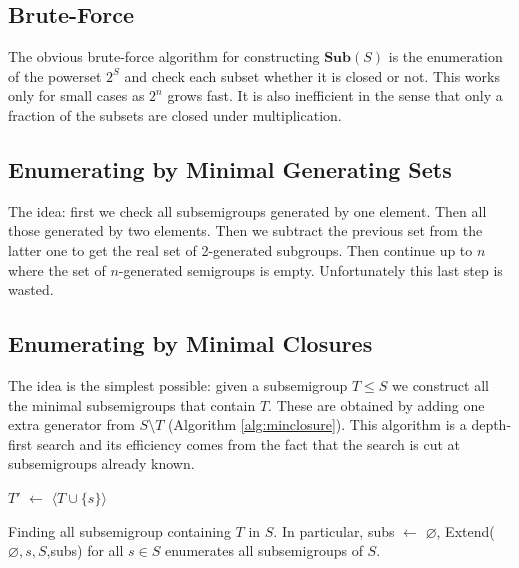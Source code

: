 \documentclass{amsart}
\newcommand{\Sub}{\mathbf{Sub}}
\theoremstyle{plain}
\theoremstyle{definition}
\begin{document}
\subsection{Brute-Force}
The obvious brute-force algorithm for constructing $\Sub(S)$ is the enumeration of the powerset $2^S$ and check each subset whether it is closed or not.
This works only for small cases as $2^n$ grows fast.
It is also inefficient in the sense that only a fraction of the subsets are closed under multiplication.
 
\subsection{Enumerating by Minimal Generating Sets}
The idea: first we check all subsemigroups generated by one element. Then all those generated by two elements. Then we subtract the previous set from the latter one to get the real set of 2-generated subgroups. Then continue up to $n$ where the set of $n$-generated semigroups is empty. Unfortunately this last step is wasted.
\subsection{Enumerating by Minimal Closures}

The idea is the simplest possible: given a subsemigroup $T\leq S$ we construct all the minimal subsemigroups that contain $T$.
These are obtained by adding one extra generator from $S\setminus T$ (Algorithm \ref{alg:minclosure}).
This algorithm is a depth-first search and its efficiency comes from the fact that the search is cut at subsemigroups already known. 
\begin{algorithm}
\BlankLine
\Name{}
$T'$ $\leftarrow$ $\langle T\cup\{s\}\rangle$\\
\caption{Finding all subsemigroup containing $T$ in $S$. In particular, \textsf{subs} $\leftarrow$ $\varnothing$,  \textsf{Extend}($\varnothing,s,S$,\textsf{subs}) for all  $s\in S$ enumerates all subsemigroups of $S$.}
\label{alg:minclosure}
\end{algorithm}
\end{document}
